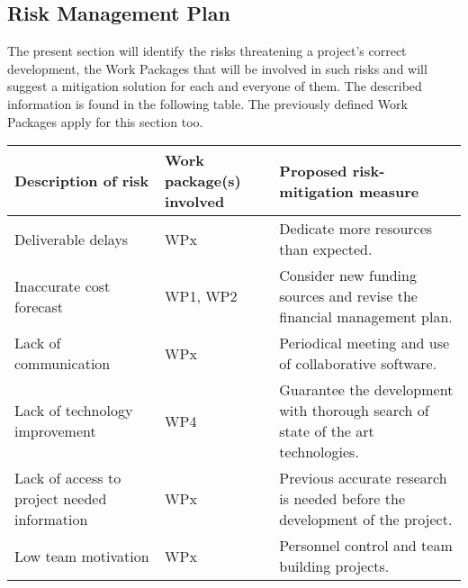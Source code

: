 \subsection{Risk Management Plan}

The present section will identify the risks threatening a project's correct development, the Work Packages that will be involved in such risks and will suggest a mitigation solution for each and everyone of them. The described information is found in the following table. The previously defined Work Packages apply for this section too.

\begin{longtable}[H]{p{4cm} p{4.7cm} p{5cm}}
	\toprule[2pt]
	
	\textbf{Description of risk} & \textbf{Work package(s) involved} & \textbf{Proposed risk-mitigation measure} \\
	
	\midrule[1.5pt] 
	\endhead
	
	Deliverable delays & WPx & Dedicate more resources than expected. \vspace{0.2cm} \\
	
	\midrule

	Inaccurate cost forecast & WP1, WP2 & Consider new funding sources and revise the financial management plan. \vspace{0.2cm} \\
	
	\midrule
	
	Lack of communication & WPx & Periodical meeting and use of collaborative software.  \vspace{0.2cm} \\

	\midrule

 	Lack of technology improvement & WP4 & Guarantee the development with thorough search of state of the art technologies.  \vspace{0.2cm} \\
 	
 	\midrule
 	
 	Lack of access to project needed information & WPx & Previous accurate research is needed before the development of the project. \vspace{0.2cm} \\
 
 	\midrule

	Low team motivation & WPx & Personnel control and team building projects. \vspace{0.2cm} \\
 	

\end{longtable}
